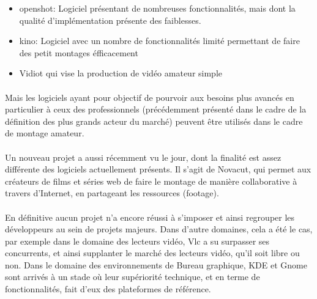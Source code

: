 \begin {itemize}

  \item {openshot: Logiciel présentant  de nombreuses fonctionnalités, mais dont la
    qualité d'implémentation présente des faiblesses.}

  \item {kino: Logiciel avec un nombre de fonctionnalités limité permettant de faire des
    petit montages éfficacement}

  \item {Vidiot qui vise la production de vidéo amateur simple}

\end {itemize}

\paragraph {}

Mais les logiciels ayant pour objectif de pourvoir aux besoins plus
avancés en particulier à ceux des professionnels (précédemment présenté
dans le cadre de la définition des plus grands acteur du marché)
peuvent être utilisés dans le cadre de montage amateur.

\paragraph{}

Un nouveau projet a aussi récemment vu le jour, dont la finalité est assez
différente des logiciels actuellement présents. Il s'agit de Novacut,
qui permet aux créateurs de films et séries web de
faire le montage de manière collaborative à travers d'Internet, en
partageant les ressources (footage).

\paragraph{}

En définitive aucun projet n'a encore réussi à s'imposer et ainsi
regrouper les développeurs au sein de projets majeurs. Dans d'autre
domaines, cela a été le cas, par exemple dans le domaine des lecteurs
vidéo, Vlc a su surpasser ses concurrents, et ainsi supplanter le
marché des lecteurs vidéo, qu'il soit libre ou non. Dans le domaine
des environnements de Bureau graphique, KDE et Gnome sont arrivés à un
stade où leur supériorité technique, et en terme de fonctionnalités,
fait d'eux des plateformes de référence.

